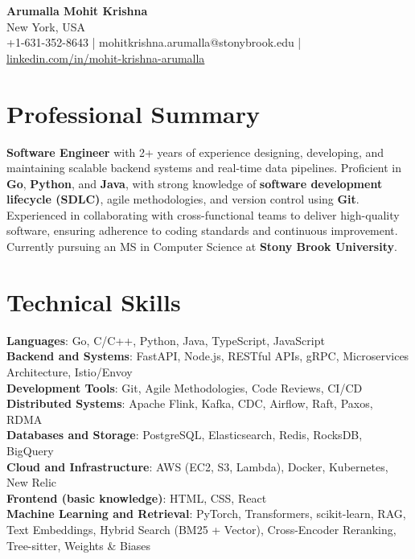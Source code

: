 \documentclass[letterpaper,11pt]{article}
\begin{document}
\begin{center}
  {\Large \textbf{Arumalla Mohit Krishna}} \\
  New York, USA \\
  +1-631-352-8643 \enspace | \enspace mohitkrishna.arumalla@stonybrook.edu \enspace | \enspace \href{https://www.linkedin.com/in/mohit-krishna-arumalla}{linkedin.com/in/mohit-krishna-arumalla}
\end{center}

\section{Professional Summary}
  \begin{itemize}[leftmargin=0.15in, label={}]
    \small{\item{
     \textbf{Software Engineer} with 2+ years of experience designing, developing, and maintaining scalable backend systems and real-time data pipelines. Proficient in \textbf{Go}, \textbf{Python}, and \textbf{Java}, with strong knowledge of \textbf{software development lifecycle (SDLC)}, agile methodologies, and version control using \textbf{Git}. Experienced in collaborating with cross-functional teams to deliver high-quality software, ensuring adherence to coding standards and continuous improvement. Currently pursuing an MS in Computer Science at \textbf{Stony Brook University}.
    }}
  \end{itemize}
\vspace{-16pt}

\section{Technical Skills}
 \begin{itemize}[leftmargin=0.15in, label={}]
    \small{\item{
     \textbf{Languages}: Go, C/C++, Python, Java, TypeScript, JavaScript \\
     \textbf{Backend and Systems}: FastAPI, Node.js, RESTful APIs, gRPC, Microservices Architecture, Istio/Envoy \\
     \textbf{Development Tools}: Git, Agile Methodologies, Code Reviews, CI/CD \\
     \textbf{Distributed Systems}: Apache Flink, Kafka, CDC, Airflow, Raft, Paxos, RDMA \\
     \textbf{Databases and Storage}: PostgreSQL, Elasticsearch, Redis, RocksDB, BigQuery \\
     \textbf{Cloud and Infrastructure}: AWS (EC2, S3, Lambda), Docker, Kubernetes, New Relic \\
     \textbf{Frontend (basic knowledge)}: HTML, CSS, React \\
     \textbf{Machine Learning and Retrieval}: PyTorch, Transformers, scikit-learn, RAG, Text Embeddings, Hybrid Search (BM25 + Vector), Cross-Encoder Reranking, Tree-sitter, Weights \& Biases
    }}
 \end{itemize}
\vspace{-16pt}
\end{document}
